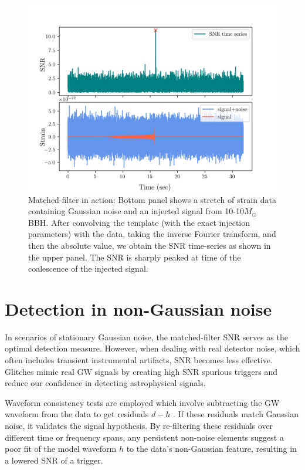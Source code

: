 \begin{figure}
    \centering
    \includegraphics[width=\textwidth]{figures/basic_data_analysis/Matched_filter.png}
    \caption{Matched-filter in action: Bottom panel shows a stretch of strain data containing Gaussian noise and an injected signal from 10-10$M_{\odot}$ BBH. After convolving the template (with the exact injection parameters) with the data, taking the inverse Fourier transform, and then the absolute value, we obtain the SNR time-series as shown in the upper panel. The SNR is sharply peaked at time of the coalescence of the injected signal.}
    \label{fig:Mf-in-action}
\end{figure}


\section{Detection in non-Gaussian noise}
In scenarios of stationary Gaussian noise, the matched-filter SNR serves as the optimal detection measure. However, when dealing with real detector noise, which often includes transient instrumental artifacts, SNR becomes less effective. Glitches mimic real GW signals by creating high SNR spurious triggers and reduce our confidence in detecting astrophysical signals.

Waveform consistency tests are employed which involve subtracting the GW waveform from the data to get residuals $d-h$ \cite{Allen:2004gu,Joshi:2022ocr}. If these residuals match Gaussian noise, it validates the signal hypothesis. By re-filtering these residuals over different time or frequency spans, any persistent non-noise elements suggest a poor fit of the model waveform $h$ to the data's non-Gaussian feature, resulting in a lowered SNR of a trigger. 


